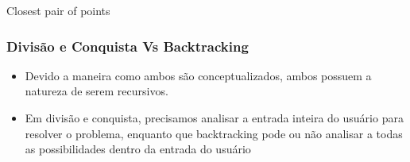     \begin{algorithm}
        \caption{Closest pair of points} 
        \begin{algorithmic}[1]
        \EndIf
        \EndIf
        \EndIf
        \EndFor
        \EndProcedure
        \end{algorithmic}
      \end{algorithm}

      \subsubsection{Divisão e Conquista Vs Backtracking}

      \begin{itemize}
          \item Devido a maneira como ambos são conceptualizados, ambos possuem a 
          natureza de serem recursivos.
          \item Em divisão e conquista, precisamos analisar a entrada inteira do usuário 
          para resolver o problema, enquanto que backtracking pode ou não analisar a todas 
          as possibilidades dentro da entrada do usuário
      \end{itemize}

